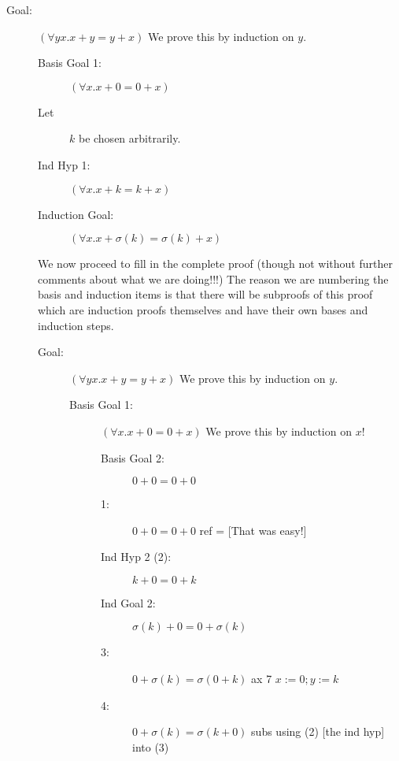 \documentclass[12pt]{book}
\begin{document}
\begin{description}

\item[Goal:]  $(\forall yx.x+y=y+x)$  We prove this by induction on $y$.

\begin{description}

\item[Basis Goal 1:]  $(\forall x.x+0=0+x)$

\item[Let] $k$ be chosen arbitrarily.

\item[Ind Hyp 1:]  $(\forall x.x+k=k+x)$ 

\item[Induction Goal:]  $(\forall x.x+\sigma(k)=\sigma(k)+x)$


\end{description}

We now proceed to fill in the complete proof (though not without further comments about what we are doing!!!)
The reason we are numbering the basis and induction items is that there will be subproofs of this proof which are
induction proofs themselves and have their own bases and induction steps.

\newpage

\begin{description}

\item[Goal:]  $(\forall yx.x+y=y+x)$  We prove this by induction on $y$.

\begin{description}

\item[Basis Goal 1:]  $(\forall x.x+0=0+x)$  We prove this by induction on $x$!

\begin{description}

\item[Basis Goal 2:]  $0+0=0+0$

\item[1:]  $0+0=0+0$  ref =  [That was easy!]

\item[Ind Hyp 2 (2):]   $k+0=0+k$

\item[Ind Goal 2:]  $\sigma(k)+0=0+\sigma(k)$

\item[3:]  $0+\sigma(k)=\sigma(0+k)$  ax 7 $x:=0; y:=k$

\item[4:]  $0+\sigma(k)=\sigma(k+0)$  subs using (2) [the ind hyp] into (3)


\end{description}
\end{description}
\end{description}
\end{description}
\end{document}

